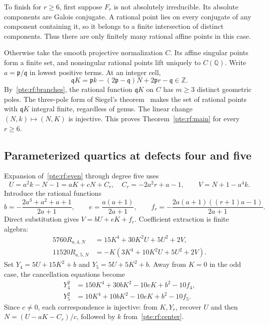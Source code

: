\documentclass[11pt,a4paper]{article}
\numberwithin{equation}{section}
\theoremstyle{definition}
\theoremstyle{plain}
\newcommand{\fp}{\mathfrak p}
\newcommand{\fq}{\mathfrak q}
\begin{document}
To finish for $r\ge6$, first suppose $F_r$ is not absolutely irreducible. Its absolute components are Galois conjugate. A rational point lies on every conjugate of any component containing it, so it belongs to a finite intersection of distinct components. Thus there are only finitely many rational affine points in this case.

Otherwise take the smooth projective normalization $C$. Its affine singular points form a finite set, and nonsingular rational points lift uniquely to $C(\mathbb Q)$. Write $a=\fp/\fq$ in lowest positive terms. At an integer cell,
\[
 \fq K=\fp k-(2\fp-\fq)N+2\fp r-\fq\in\mathbb Z.
\]
By~\eqref{pte:rf:branches}, the rational function $\fq K$ on $C$ has $m\ge3$ distinct geometric poles. The three-pole form of Siegel's theorem~\cite[Theorem 1.1]{pte-levin} makes the set of rational points with $\fq K$ integral finite, regardless of genus. The linear change $(N,k)\mapsto(N,K)$ is injective. This proves Theorem~\ref{pte:rf:main} for every $r\ge6$.


\subsection{Parameterized quartics at defects four and five}
Expansion of~\eqref{pte:rf:even} through degree five uses
\[
 U=a^2k-N-1=aK+cN+C_r,\quad C_r=-2a^2r+a-1,\qquad
 V=N+1-a^4k.
\]
Introduce the rational functions
\begin{equation}\label{pte:rf:parameters}
 b=-\frac{2a^3+a^2+a+1}{2a+1},\qquad
 e=\frac{a(a+1)}{2a+1},\qquad
 f_r=-\frac{2a(a+1)((r+1)a-1)}{2a+1}.
\end{equation}
Direct substitution gives $V=bU+eK+f_r$. Coefficient extraction is finite algebra:
\begin{align}
 5760R_{a,4,N}&=15K^4+30K^2U+5U^2+2V,\label{pte:rf:r4}\\
 11520R_{a,5,N}&=-K(3K^4+10K^2U+5U^2+2V).\label{pte:rf:r5}
\end{align}
Set $Y_4=5U+15K^2+b$ and $Y_5=5U+5K^2+b$. Away from $K=0$ in the odd case, the cancellation equations become
\begin{align}
 Y_4^2&=150K^4+30bK^2-10eK+b^2-10f_4,\label{pte:rf:q4}\\
 Y_5^2&=10K^4+10bK^2-10eK+b^2-10f_5.\label{pte:rf:q5}
\end{align}
Since $c\ne0$, each correspondence is injective: from $K,Y_r$, recover $U$ and then $N=(U-aK-C_r)/c$, followed by $k$ from~\eqref{pte:rf:center}.
\end{document}

